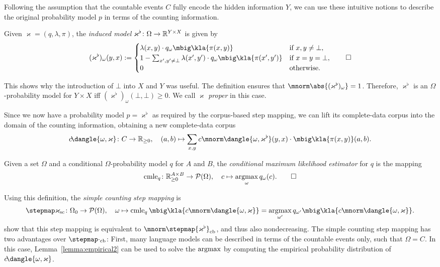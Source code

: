 Following the assumption that the countable events $C$ fully encode the hidden
information $Y$, we can use these intuitive notions to describe the original
probability model $p$ in terms of the counting information.

\pagebreak
\begin{definition}
 Given $\varkappa=(q,\lambda,\pi)$, the \emph{induced model}
 $\varkappa^\flat\colon\Omega\to\mathbb R^{Y\times X}$ is given by
 \[
  (\varkappa^\flat)_\omega(y,x) := \begin{cases}
   \lambda(x,y) \cdot q_\omega\mbig\kla{\pi(x,y)} & \text{if } x,y\neq\bot, \\
   1 - \sum_{x',y'\neq\bot} \lambda(x',y') \cdot q_\omega\mbig\kla{\pi(x',y')} & \text{if } x = y = \bot, \\
   0 & \text{otherwise}.
  \end{cases}\qedhere
 \]
\end{definition}

This shows why the introduction of $\bot$ into $X$ and $Y$ was useful. The
definition ensures that $\mnorm\abs{(\varkappa^\flat)_\omega} = 1$. Therefore,
$\varkappa^\flat$ is an $\Omega$-probability model for $Y\times X$ iff
$(\varkappa^\flat)_\omega(\bot,\bot) \geq 0$. We call $\varkappa$ \emph{proper}
in this case.

Since we now have a probability model $p = \varkappa^\flat$ as required by the
corpus-based step mapping, we can lift its complete-data corpus into the domain
of the counting information, obtaining a new complete-data corpus
\[
 c\!\dangle{\omega,\varkappa}\colon C \to \zr_{\geq0}, \quad
 (a,b) \mapsto \sum_{x,y} c\mnorm\dangle{\omega,\varkappa^\flat}(y,x) \cdot \mbig\kla{\pi(x,y)}(a,b).
\]

\begin{definition}
 Given a set $\Omega$ and a conditional $\Omega$-probability model $q$ for $A$
 and $B$, the \emph{conditional maximum likelihood estimator} for $q$ is the mapping
 \[
  \cmle_q\colon \zr_{\geq0}^{A\times B} \to \up(\Omega),
  \quad
  c \mapsto \argmax_\omega q_\omega(c). \qedhere
 \]
\end{definition}

Using this definition, the \emph{simple counting step mapping} is
\[
 \stepmap\varkappa_\mathrm{sc}\colon \Omega_0 \to \up(\Omega), \quad
 \omega \mapsto \cmle_q\mbig\kla{c\mnorm\dangle{\omega,\varkappa}} = \argmax_{\omega'} q_{\omega'}\mbig\kla{c\mnorm\dangle{\omega,\varkappa}}.
\]
\cite[p.~13]{bucstuvog15} show that this step mapping is
equivalent to $\mnorm\stepmap{\varkappa^\flat}_\mathrm{cb}$, and thus also
nondecreasing.
The simple counting step mapping has two advantages over
$\stepmap\cdot_\mathrm{cb}$: First, many language models can be described in
terms of the countable events only, such that $\Omega = C$. In this case,
Lemma~\ref{lemma:empirical2} can be used to solve the $\argmax$ by computing
the empirical probability distribution of $c\!\dangle{\omega,\varkappa}$.

